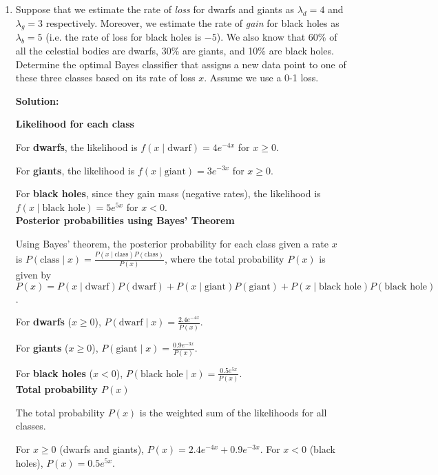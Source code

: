 \documentclass{article}
\newenvironment{solution}{\color{blue} \smallskip \textbf{Solution:}}{}
\begin{document}
\begin{enumerate}
\item Suppose that we estimate the rate of \textit{loss} for dwarfs and giants as $\lambda_{d} = 4$ and $\lambda_{g} = 3$ respectively. Moreover, we estimate the rate of \textit{gain} for black holes as $\lambda_{b} = 5$ (i.e. the rate of loss for black holes is $-5$). We also know that 60\% of all the celestial bodies are dwarfs, 30\% are giants, and 10\% are black holes. Determine the optimal Bayes classifier that assigns a new data point to one of these three classes based on its rate of loss $x$. Assume we use a 0-1 loss.

\begin{solution}


\textbf{Likelihood for each class}

For \textbf{dwarfs}, the likelihood is \( f(x \mid \text{dwarf}) = 4 e^{-4x} \) for \( x \geq 0 \). 

For \textbf{giants}, the likelihood is \( f(x \mid \text{giant}) = 3 e^{-3x} \) for \( x \geq 0 \). 

For \textbf{black holes}, since they gain mass (negative rates), the likelihood is \( f(x \mid \text{black hole}) = 5 e^{5x} \) for \( x < 0 \).\\

\textbf{Posterior probabilities using Bayes' Theorem}

Using Bayes' theorem, the posterior probability for each class given a rate \(x\) is \( P(\text{class} \mid x) = \frac{P(x \mid \text{class}) P(\text{class})}{P(x)} \), where the total probability \(P(x)\) is given by \( P(x) = P(x \mid \text{dwarf}) P(\text{dwarf}) + P(x \mid \text{giant}) P(\text{giant}) + P(x \mid \text{black hole}) P(\text{black hole}) \).


For \textbf{dwarfs} (\( x \geq 0 \)), \( P(\text{dwarf} \mid x) = \frac{2.4 e^{-4x}}{P(x)} \). 

For \textbf{giants} (\( x \geq 0 \)), \( P(\text{giant} \mid x) = \frac{0.9 e^{-3x}}{P(x)} \). 

For \textbf{black holes} (\( x < 0 \)), \( P(\text{black hole} \mid x) = \frac{0.5 e^{5x}}{P(x)} \).\\

\textbf{Total probability \(P(x)\)}

The total probability \(P(x)\) is the weighted sum of the likelihoods for all classes. 

For \(x \geq 0\) (dwarfs and giants), \( P(x) = 2.4 e^{-4x} + 0.9 e^{-3x} \). For \(x < 0\) (black holes), \( P(x) = 0.5 e^{5x} \).\\


\end{solution}
\end{enumerate}
\end{document}
